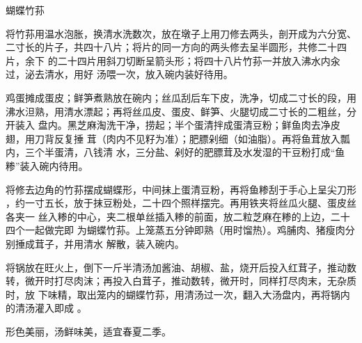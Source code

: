 \begin{recipe}{蝴蝶竹荪}

\ingredients


\preparation

\step 将竹荪用温水泡胀，换清水洗数次，放在墩子上用刀修去两头，剖开成为六分宽、
二寸长的片子，共四十八片；将片的同一方向的两头修去呈半圆形，共修二十四片，余下
的二十四片用斜刀切断呈箭头形；将四十八片竹荪一并放入沸水内汆过，泌去清水，用好
汤喂一次，放入碗内装好待用。

\step 鸡蛋摊成蛋皮；鲜笋煮熟放在碗内；丝瓜刮后车下皮，洗净，切成二寸长的段，用
沸水泹熟，用清水漂起；再将丝瓜皮、蛋皮、鲜笋、火腿切成二寸长的二粗丝，分开装入
盘内。黑芝麻淘洗干净，捞起；半个蛋清拌成蛋清豆粉；鲜鱼肉去净皮翅，用刀背反复捶
茸（肉内不见籽为准）；肥膘剁细（如油脂）。再将鱼茸放入瓢内，三个半蛋清，八钱清
水，三分盐、剁好的肥膘茸及水发湿的干豆粉打成“鱼糁”装入碗内待用。

\step 将修去边角的竹荪摆成蝴蝶形，中间抹上蛋清豆粉，再将鱼糁刮于手心上呈尖刀形
，约一寸五长，放于抹豆粉处，二十四个照样摆完。再用铁夹将丝瓜火腿、蛋皮丝各夹一
丝入糁的中心，夹二根单丝插入糁的前面，放二粒芝麻在糁的上边，二十四个一起做完即
为蝴蝶竹荪。上笼蒸五分钟即熟（用时馏热）。鸡脯肉、猪瘦肉分别捶成茸子，并用清水
解散，装入碗内。

\step 将锅放在旺火上，倒下一斤半清汤加酱油、胡椒、盐，烧开后投入红茸子，推动数
转，微开时打尽肉沫；再投入白茸子，推动数转，微开时，同样打尽肉末，无杂质时，放
下味精，取出笼内的蝴蝶竹荪，用清汤过一次，翻入大汤盘内，再将锅内的清汤灌入即成
。

\features

形色美丽，汤鲜味美，适宜春夏二季。

\end{recipe}

